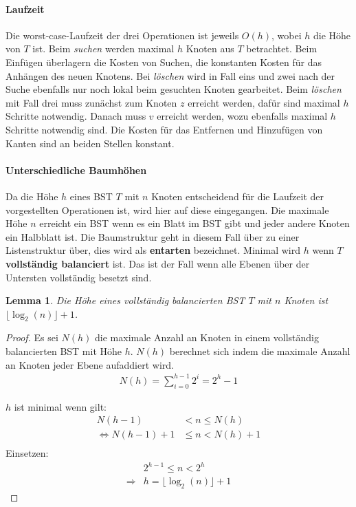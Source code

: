 \documentclass[a4paper,12pt]{article}
\begin{document}
\paragraph{Laufzeit}
Die worst-case-Laufzeit der drei Operationen ist jeweils $\mathit{O(h)}$, wobei $h$ die Höhe von $T$ ist. Beim \textit{suchen} werden maximal $h$ Knoten aus $T$ betrachtet. Beim Einfügen überlagern die Kosten von Suchen, die konstanten Kosten für das Anhängen des neuen Knotens. Bei \textit{löschen} wird in Fall eins und zwei nach der Suche ebenfalls nur noch lokal beim gesuchten Knoten gearbeitet. Beim \textit{löschen} mit Fall drei muss zunächst zum Knoten $z$ erreicht werden, dafür sind maximal $h$ Schritte notwendig. Danach muss $v$ erreicht werden, wozu ebenfalls maximal $h$ Schritte notwendig sind. Die Kosten für das Entfernen und Hinzufügen von Kanten sind an beiden Stellen konstant.  



\paragraph{Unterschiedliche Baumhöhen}
Da die Höhe $h$ eines BST $T$ mit $n$ Knoten entscheidend für die Laufzeit der vorgestellten Operationen ist, wird hier auf diese eingegangen. Die maximale Höhe $n$ erreicht ein BST wenn es ein Blatt im BST gibt und jeder andere Knoten ein Halbblatt ist. Die Baumstruktur geht in diesem Fall über zu einer Listenstruktur über, dies wird als \textbf{entarten} bezeichnet. Minimal wird $h$ wenn $T$ \textbf{vollständig balanciert} ist. Das ist der Fall wenn alle Ebenen über der Untersten vollständig besetzt sind.
\newtheorem{Lemma}{Lemma}[section]
\begin{Lemma} Die Höhe eines vollständig balancierten BST $T$ mit $n$ Knoten ist $ \lfloor \log_2{(n)} \rfloor + 1 $. 
\end{Lemma}
\begin{proof}
	
	Es sei $\mathit{N(h)}$ die maximale Anzahl an Knoten in einem vollständig balancierten BST mit Höhe $h$.
	$\mathit{N(h)}$  berechnet sich indem die maximale Anzahl an Knoten jeder Ebene aufaddiert wird.\\
	\begin{align*}
	\mathit{N(h)} = \sum\limits_{i=0}^{h-1} 2^i = 2^h - 1 
	\end{align*}
	
	\noindent	$h$ ist minimal wenn gilt:\\
	\begin{align*}
	\mathit{N(h-1)} &< n \leq \mathit{N(h)}\\
	\Leftrightarrow \mathit{N(h-1)} + 1 &\leq n < \mathit{N(h)} + 1\\
	\end{align*}
	Einsetzen:\\
	\begin{align*}
	&2^{h - 1} \leq n < 2^h\\
	\Rightarrow & h =  \lfloor \log_2{(n)} \rfloor + 1
	\end{align*}
	
\end{proof}
\end{document}
